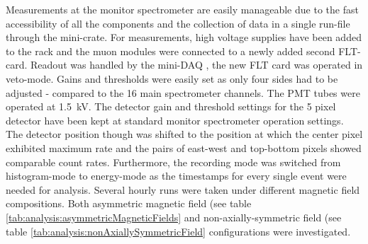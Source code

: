   Measurements at the monitor spectrometer are easily manageable due to the fast accessibility of all the components and the collection of data in a single run-file through the mini-crate.
  For measurements, high voltage supplies have been added to the  rack and the muon modules were connected to a newly added second FLT-card. Readout was handled by the mini-DAQ , the new FLT card was operated in veto-mode. Gains and thresholds were easily set as only four sides had to be adjusted - compared to the 16 main spectrometer channels. The PMT tubes were operated at \SI{1.5}{\kilo\volt}. The detector gain and threshold settings for the 5 pixel detector have been kept at standard monitor spectrometer operation settings. The detector position though was shifted to the position at which the center pixel exhibited maximum rate and the pairs of east-west and top-bottom pixels showed comparable count rates. Furthermore, the recording mode was switched from histogram-mode to energy-mode as the timestamps for every single event were needed for analysis. 
  Several hourly runs were taken under different magnetic field compositions. Both asymmetric magnetic field (see table \ref{tab:analysis:asymmetricMagneticFields} and non-axially-symmetric field (see table \ref{tab:analysis:nonAxiallySymmetricField} configurations were investigated.
